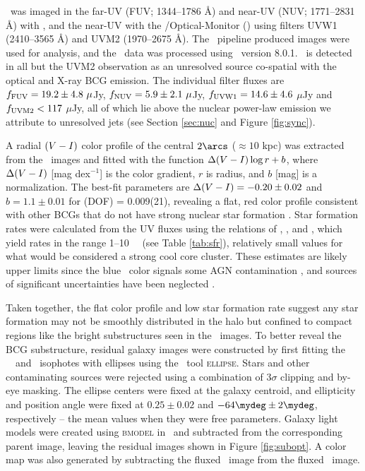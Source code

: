 \documentclass[iop]{emulateapj}
\begin{document}
\rbs\ was imaged in the far-UV (FUV; 1344--1786 \AA) and near-UV (NUV;
1771--2831 \AA) with \galex, and the near-UV with the
\xmm/Optical-Monitor (\xom) using filters UVW1 (2410--3565 \AA) and
UVM2 (1970--2675 \AA). The \galex\ pipeline produced images were used
for analysis, and the \xom\ data was processed using \sas\ version
8.0.1. \rbs\ is detected in all but the UVM2 observation as an
unresolved source co-spatial with the optical and X-ray BCG
emission. The individual filter fluxes are $f_{\rm{FUV}} = 19.2 \pm
4.8 ~\mu$Jy, $f_{\rm{NUV}} = 5.9 \pm 2.1 ~\mu$Jy, $f_{\rm{UVW1}} =
14.6 \pm 4.6$ $\mu$Jy and $f_{\rm{UVM2}} < 117$ $\mu$Jy, all of which
lie above the nuclear power-law emission we attribute to unresolved
jets (see Section \ref{sec:nuc} and Figure \ref{fig:sync}).

A radial $(V-I)$ color profile of the central $2\arcs$ ($\approx
10$ kpc) was extracted from the \hst\ images and fitted with the
function $\Delta(V-I) \log r + b$, where $\Delta(V-I)$
[mag dex$^{-1}$] is the color gradient, $r$ is radius, and $b$ [mag]
is a normalization. The best-fit parameters are $\Delta(V-I) =
-0.20 \pm 0.02$ and $b = 1.1 \pm 0.01$ for \chisq(DOF) = 0.009(21),
revealing a flat, red color profile consistent with other BCGs that do
not have strong nuclear star formation \citep[\eg][]{rafferty06}. Star
formation rates were calculated from the UV fluxes using the relations
of \citet{kennicutt2}, \citet{2006ApJ...642..775M}, and
\citet{salim2007}, which yield rates in the range 1--10 ~\msolpy\ (see
Table \ref{tab:sfr}), relatively small values for what would be
considered a strong cool core cluster. These estimates are likely
upper limits since the blue \galex\ color signals some AGN
contamination \citep{2005AJ....130.1022A}, and sources of significant
uncertainties have been neglected \citep[\eg][]{1992ApJ...388..310K,
  2004AJ....127.2002K, hicksuv, 2010MNRAS.tmp..626G}.

Taken together, the flat color profile and low star formation rate
suggest any star formation may not be smoothly distributed in the halo
but confined to compact regions like the bright substructures seen in
the \hst\ images. To better reveal the BCG substructure, residual
galaxy images were constructed by first fitting the \hst\ \myv\ and
\myi\ isophotes with ellipses using the \iraf\ tool
                {\textsc{ellipse}}. Stars and other contaminating
                sources were rejected using a combination of $3\sigma$
                clipping and by-eye masking. The ellipse centers were
                fixed at the galaxy centroid, and ellipticity and
                position angle were fixed at $0.25 \pm 0.02$ and
                $-64\mydeg \pm 2\mydeg$, respectively -- the mean
                values when they were free parameters. Galaxy light
                models were created using {\textsc{bmodel}} in
                \iraf\ and subtracted from the corresponding parent
                image, leaving the residual images shown in Figure
                \ref{fig:subopt}. A color map was also generated by
                subtracting the fluxed \myi\ image from the fluxed
                \myv\ image.
\end{document}
